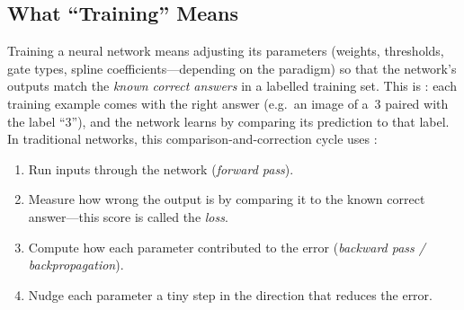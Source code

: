 \subsection{What ``Training'' Means}
\label{sec:training-overview}

Training a neural network means adjusting its parameters (weights,
thresholds, gate types, spline coefficients---depending on the paradigm)
so that the network's outputs match the \emph{known correct answers} in
a labelled training set. This is : each
training example comes with the right answer (e.g.\ an image of a~3
paired with the label ``3''), and the network learns by comparing its
prediction to that label. In traditional networks, this comparison-and-correction
cycle uses :

\begin{enumerate}[leftmargin=2em]
  \item Run inputs through the network (\emph{forward pass}).
  \item Measure how wrong the output is by comparing it to the known
    correct answer---this score is called the \emph{loss}.
  \item Compute how each parameter contributed to the error
    (\emph{backward pass / backpropagation}).
  \item Nudge each parameter a tiny step in the direction that
    reduces the error.
\end{enumerate}

